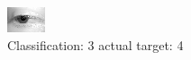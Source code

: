 \begin{figure}[h!]
\begin{center}
\includegraphics[width=0.60\columnwidth]{figures/ID2607_class_3_target_4.png}
\end{center}
\caption{ Classification: 3 actual target: 4}
\label{fig:ID2607_class_3_target_4}
\end{figure}
